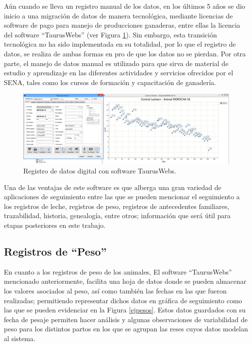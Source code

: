 Aún cuando se lleva un registro manual de los datos, en los últimos 5 años se dio inicio a una migración de datos de manera tecnológica, mediante licencias de software de pago para manejo de producciones ganaderas, entre ellas la licencia del software ``TaurusWebs'' (ver Figura \ref{tauruspng}). Sin embargo, esta transición tecnológica no ha sido implementada en su totalidad, por lo que el registro de datos, se realiza de ambas formas en pro de que los datos no se pierdan. Por otra parte, el manejo de datos manual es utilizado para que sirva de material de estudio y aprendizaje en las diferentes actividades y servicios ofrecidos por el SENA, tales como los cursos de formación y capacitación de ganadería.

\begin{figure}[H]
	 \begin{center}
	 \includegraphics[scale=0.345]{img/ejtaurus.jpg}
	 \end{center}
	 \caption{Registro de datos digital con software TaurusWebs. \label{tauruspng}}
\end{figure}

Una de las ventajas de este software es que alberga una gran variedad de aplicaciones de seguimiento entre las que se pueden mencionar el seguimiento a los registros de leche, registros de peso, registros de antecedentes familiares, trazabilidad, historia, genealogía, entre otros; información que será útil para etapas posteriores en este trabajo.

\subsection{Registros de ``Peso''}

En cuanto a los registros de peso de los animales, El software ``TaurusWebs'' mencionado anteriormente, facilita una hoja de datos donde se pueden almacenar los valores asociados al peso, así como también las fechas en las que fueron realizadas; permitiendo representar dichos datos en gráfica de seguimiento como las que se pueden evidenciar  en la Figura \ref{ejpesos}. Estos datos guardados con su fecha de pesaje permiten hacer análisis y algunas observaciones de variabilidad de peso para los distintos partos en los que se agrupan las reses cuyos datos modelan al sistema.

